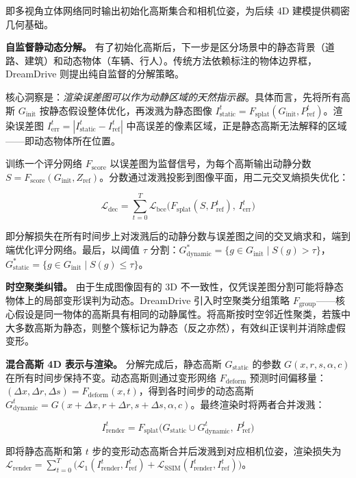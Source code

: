 即多视角立体网络同时输出初始化高斯集合和相机位姿，为后续 4D 建模提供稠密几何基础。

\textbf{自监督静动态分解。} 有了初始化高斯后，下一步是区分场景中的静态背景（道路、建筑）和动态物体（车辆、行人）。传统方法依赖标注的物体边界框，DreamDrive 则提出纯自监督的分解策略。

核心洞察是：\emph{渲染误差图可以作为动静区域的天然指示器}。具体而言，先将所有高斯 $G_\mathrm{init}$ 按静态假设整体优化，再泼溅为静态图像 $I_\mathrm{static}^t = F_\mathrm{splat}(G_\mathrm{init}, P_\mathrm{ref}^t)$。渲染误差图 $I_\mathrm{err}^t = |I_\mathrm{static}^t - I_\mathrm{ref}^t|$ 中高误差的像素区域，正是静态高斯无法解释的区域——即动态物体所在位置。

训练一个评分网络 $F_\mathrm{score}$ 以误差图为监督信号，为每个高斯输出动静分数 $S = F_\mathrm{score}(G_\mathrm{init}, Z_\mathrm{ref})$。分数通过泼溅投影到图像平面，用二元交叉熵损失优化：

\begin{equation}
\mathcal{L}_\mathrm{dec} = \sum_{t=0}^{T} \mathcal{L}_\mathrm{bce}\bigl(F_\mathrm{splat}(S, P_\mathrm{ref}^t),\, I_\mathrm{err}^t\bigr)
\end{equation}

即分解损失在所有时间步上对泼溅后的动静分数与误差图之间的交叉熵求和，端到端优化评分网络。最后，以阈值 $\tau$ 分割：$G_\mathrm{dynamic}^* = \{g \in G_\mathrm{init} \mid S(g) > \tau\}$，$G_\mathrm{static}^* = \{g \in G_\mathrm{init} \mid S(g) \leq \tau\}$。

\textbf{时空聚类纠错。} 由于生成图像固有的 3D 不一致性，仅凭误差图分割可能将静态物体上的局部变形误判为动态。DreamDrive 引入时空聚类分组策略 $F_\mathrm{group}$——核心假设是同一物体的高斯具有相同的动静属性。将高斯按时空邻近性聚类，若簇中大多数高斯为静态，则整个簇标记为静态（反之亦然），有效纠正误判并消除虚假变形。

\textbf{混合高斯 4D 表示与渲染。} 分解完成后，静态高斯 $G_\mathrm{static}$ 的参数 $G(x, r, s, \alpha, c)$ 在所有时间步保持不变。动态高斯则通过变形网络 $F_\mathrm{deform}$ 预测时间偏移量：$(\Delta x, \Delta r, \Delta s) = F_\mathrm{deform}(x, t)$，得到各时间步的动态高斯 $G_\mathrm{dynamic}^t = G(x + \Delta x, r + \Delta r, s + \Delta s, \alpha, c)$。最终渲染时将两者合并泼溅：

\begin{equation}
I_\mathrm{render}^t = F_\mathrm{splat}\bigl(G_\mathrm{static} \cup G_\mathrm{dynamic}^t,\, P_\mathrm{ref}^t\bigr)
\end{equation}

即将静态高斯和第 $t$ 步的变形动态高斯合并后泼溅到对应相机位姿，渲染损失为 $\mathcal{L}_\mathrm{render} = \sum_{t=0}^{T} \bigl(\mathcal{L}_1(I_\mathrm{render}^t, I_\mathrm{ref}^t) + \mathcal{L}_\mathrm{SSIM}(I_\mathrm{render}^t, I_\mathrm{ref}^t)\bigr)$。

